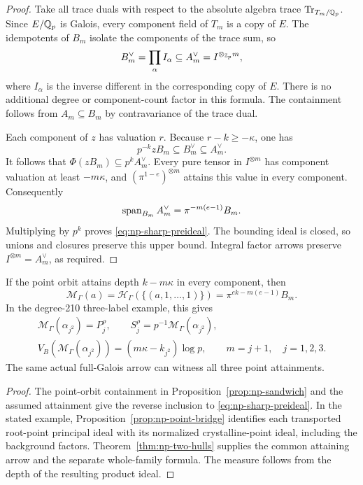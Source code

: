 \begin{proof}
Take all trace duals with respect to the absolute algebra
trace $\operatorname{Tr}_{T_m/\mathbb Q_p}$. Since $E/\mathbb Q_p$
is Galois, every component field of $T_m$ is a copy of
$E$. The idempotents of $B_m$ isolate the components
of the trace sum, so
\begin{equation}\label{eq:np-two-duals}
 B_m^\vee=\prod_\alpha I_\alpha
       \subseteq A_m^\vee=I^{\otimes_{\mathbb Z_p}m},
\end{equation}
where $I_\alpha$ is the inverse different in the
corresponding copy of $E$. There is no additional
degree or component-count factor in this formula.
The containment follows from $A_m\subseteq B_m$
by contravariance of the trace dual.

Each component of $z$ has valuation $r$. Because
$r-k\ge-\kappa$, one has
\[
 p^{-k}zB_m\subseteq B_m^\vee\subseteq A_m^\vee.
\]
It follows that $\Phi(zB_m)\subseteq p^kA_m^\vee$.
Every pure tensor in $I^{\otimes m}$ has component
valuation at least $-m\kappa$, and
$(\pi^{1-e})^{\otimes m}$ attains this value in every
component. Consequently
\[
 \operatorname{span}_{B_m}A_m^\vee=\pi^{-m(e-1)}B_m.
\]
Multiplying by $p^k$ proves
\eqref{eq:np-sharp-preideal}. The bounding ideal is
closed, so unions and closures preserve this upper
bound. Integral factor arrows preserve
$I^{\otimes m}=A_m^\vee$, as required.
\end{proof}

\begin{corollary}
\label{cor:np-exact-preideal}
If the point orbit attains depth $k-m\kappa$ in every
component, then
\[
 \mathcal M_\Gamma(a)=
 \mathcal H_\Gamma(\{(a,1,\ldots,1)\})
       =\pi^{ek-m(e-1)}B_m.
\]
In the degree-210 three-label example, this gives
\begin{equation}\label{eq:np-exact-preideal}
 \begin{gathered}
 \mathcal M_\Gamma(\alpha_{j^2})=P_j^\rho,
 \qquad S_j^\rho=p^{-1}\mathcal M_\Gamma(\alpha_{j^2}),\\
 V_B(\mathcal M_\Gamma(\alpha_{j^2}))
       =(m\kappa-k_{j^2})\log p,
 \qquad m=j+1,\quad j=1,2,3.
 \end{gathered}
\end{equation}
The same actual full-Galois arrow can witness all three
point attainments.
\end{corollary}

\begin{proof}
The point-orbit containment in
Proposition~\ref{prop:np-sandwich} and the assumed
attainment give the reverse inclusion to
\eqref{eq:np-sharp-preideal}. In the stated example,
Proposition~\ref{prop:np-point-bridge} identifies each
transported root-point principal ideal with its
normalized crystalline-point ideal, including the
background factors. Theorem~\ref{thm:np-two-hulls}
supplies the common attaining arrow and the separate
whole-family formula. The measure follows from the
depth of the resulting product ideal.
\end{proof}

